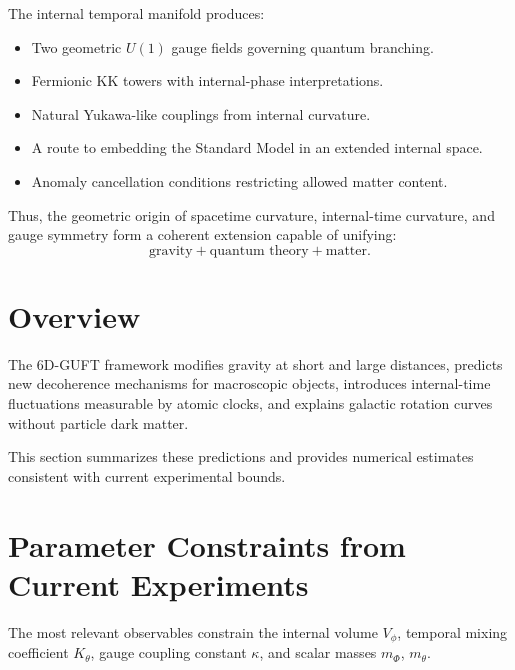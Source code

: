 \documentclass[12pt]{article}
\begin{document}
The internal temporal manifold produces:
\begin{itemize}
\item Two geometric \(U(1)\) gauge fields governing quantum branching.
\item Fermionic KK towers with internal-phase interpretations.
\item Natural Yukawa-like couplings from internal curvature.
\item A route to embedding the Standard Model in an extended internal space.
\item Anomaly cancellation conditions restricting allowed matter content.
\end{itemize}

Thus, the geometric origin of spacetime curvature, internal-time curvature,
and gauge symmetry form a coherent extension capable of unifying:
\[
\text{gravity} + \text{quantum theory} + \text{matter}.
\]



\newpage
\section{Overview}
The 6D-GUFT framework modifies gravity at short and large distances, predicts
new decoherence mechanisms for macroscopic objects, introduces internal-time
fluctuations measurable by atomic clocks, and explains galactic rotation
curves without particle dark matter.

This section summarizes these predictions and provides numerical estimates
consistent with current experimental bounds.


\newpage
\section{Parameter Constraints from Current Experiments}

The most relevant observables constrain the internal volume \(V_\phi\),
temporal mixing coefficient \(K_\theta\), gauge coupling constant \(\kappa\),
and scalar masses \(m_\Phi\), \(m_\theta\).
\end{document}
